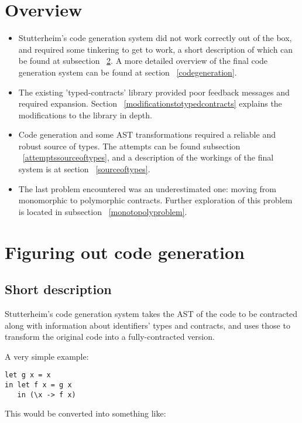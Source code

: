\documentclass[10pt]{report}
\begin{document}
\section{Overview}

\begin{itemize}
\item Stutterheim's code generation system did not work correctly out of the box, and required some tinkering to get to work, a short description of which can be found at subsection ~\ref{figuringoutcodegeneration}. A more detailed overview of the final code generation system can be found at section ~\ref{codegeneration}.
\item The existing 'typed-contracts' library provided poor feedback messages and required expansion. Section ~\ref{modificationstotypedcontracts} explains the modifications to the library in depth.
\item Code generation and some AST transformations required a reliable and robust source of types. The attempts can be found subsection ~\ref{attemptssourceoftypes}, and a description of the workings of the final system is at section ~\ref{sourceoftypes}.
\item The last problem encountered was an underestimated one: moving from monomorphic to polymorphic contracts. Further exploration of this problem is located in subsection ~\ref{monotopolyproblem}.
\end{itemize} 

\section{Figuring out code generation}
\label{figuringoutcodegeneration}

\subsection{Short description}
Stutterheim's code generation system takes the AST of the code to be contracted along with information about identifiers' types and contracts, and uses those to transform the original code into a fully-contracted version.

A very simple example:

\begin{lstlisting}[caption=A simple expression in Stutterheim's $\lambda_c$ language.]
let g x = x
in let f x = g x
   in (\x -> f x)
\end{lstlisting}

This would be converted into something like:
\end{document}

